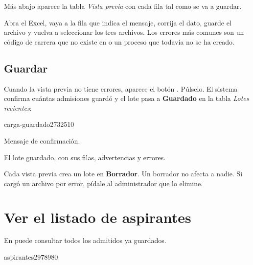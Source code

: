 Más abajo aparece la tabla \emph{Vista previa} con cada fila tal como se va a guardar.

\begin{consejo}
Abra el Excel, vaya a la fila que indica el mensaje, corrija el dato, guarde el archivo y vuelva
a seleccionar los tres archivos. Los errores más comunes son un código de carrera que no existe
en  o un proceso que todavía no se ha creado.
\end{consejo}

\subsection{Guardar}

Cuando la vista previa no tiene errores, aparece el botón . Púlselo.
El sistema confirma cuántas admisiones guardó y el lote pasa a \textbf{Guardado} en la tabla
\emph{Lotes recientes}:

\begin{captura}{carga-guardado}{2732}{510}
\end{captura}

\begin{leyenda}
  \item[1] Mensaje de confirmación.
  \item[2] El lote guardado, con sus filas, advertencias y errores.
\end{leyenda}

\begin{nota}
Cada vista previa crea un lote en \textbf{Borrador}. Un borrador no afecta a nadie. Si cargó un
archivo por error, pídale al administrador que lo elimine.
\end{nota}

\section{Ver el listado de aspirantes}

En  puede consultar todos los admitidos ya guardados.

\begin{captura}{aspirantes}{2978}{980}
\end{captura}

